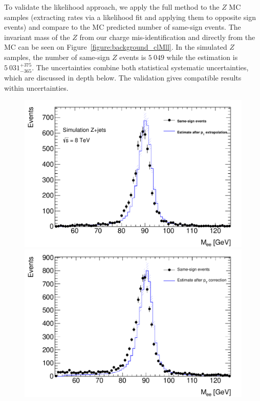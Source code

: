 To validate the likelihood approach, we apply the full method to the $Z$ MC samples (extracting rates via a likelihood fit and applying them to opposite sign events) and compare to the MC predicted number of same-sign events. The invariant mass of the $Z$ from our charge mis-identification and directly from the MC can be seen on Figure~\ref{figure:background_clMll}. In the simulated $Z$ samples, the number of same-sign $Z$ events is $5~049$ while the estimation is $5~031^{+375}_{-365}$.  The uncertainties combine both statistical systematic uncertainties, which are discussed in depth below. The validation gives compatible results within uncertainties. 
 
\begin{figure}[htb!]
\centering
\begin{minipage}[h]{0.5\textwidth}
    \centering \includegraphics[width=\textwidth]{figs/qmis/ClosureMllMC}
\end{minipage}\hfill
\begin{minipage}[h]{0.5\textwidth}
    \centering \includegraphics[width=\textwidth]{figs/qmis/ClosureMlldata}

\end{minipage}
\end{figure}
